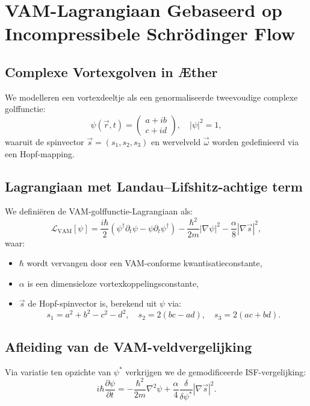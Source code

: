 
\section{VAM-Lagrangiaan Gebaseerd op Incompressibele Schrödinger Flow}\label{sec:appendix_11}

\subsection{Complexe Vortexgolven in Æther}

We modelleren een vortexdeeltje als een genormaliseerde tweevoudige complexe golffunctie:
\[
    \psi(\vec{r}, t) = \begin{pmatrix} a + ib \\ c + id \end{pmatrix}, \quad |\psi|^2 = 1,
\]
waaruit de spinvector $\vec{s} = (s_1, s_2, s_3)$ en wervelveld $\vec{\omega}$ worden gedefinieerd via een Hopf-mapping.

\subsection{Lagrangiaan met Landau–Lifshitz-achtige term}

We definiëren de VAM-golffunctie-Lagrangiaan als:
\begin{equation}
    \mathcal{L}_\text{VAM}[\psi] =
    \frac{i\hbar}{2} \left( \psi^\dagger \partial_t \psi - \psi \partial_t \psi^\dagger \right)
    - \frac{\hbar^2}{2m} |\nabla \psi|^2
    - \frac{\alpha}{8} |\nabla \vec{s}|^2,
\end{equation}
waar:
\begin{itemize}
    \item $\hbar$ wordt vervangen door een VAM-conforme kwantisatieconstante,
    \item $\alpha$ is een dimensieloze vortexkoppelingsconstante,
    \item $\vec{s}$ de Hopf-spinvector is, berekend uit $\psi$ via:
    \[
        s_1 = a^2 + b^2 - c^2 - d^2, \quad
        s_2 = 2(bc - ad), \quad
        s_3 = 2(ac + bd).
    \]
\end{itemize}

\subsection{Afleiding van de VAM-veldvergelijking}

Via variatie ten opzichte van $\psi^*$ verkrijgen we de gemodificeerde ISF-vergelijking:
\[
    i\hbar \frac{\partial \psi}{\partial t} =
    - \frac{\hbar^2}{2m} \nabla^2 \psi
    + \frac{\alpha}{4} \frac{\delta}{\delta \psi^*} |\nabla \vec{s}|^2.
\]

